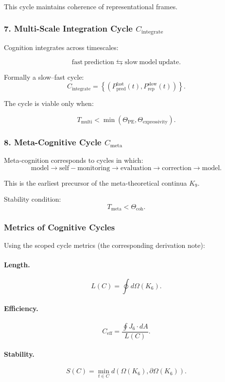 This cycle maintains coherence of representational frames.

\subsubsection{7. Multi-Scale Integration Cycle $C_{\mathrm{integrate}}$}

Cognition integrates across timescales:

\[
 \mathrm{fast\ prediction}
 \leftrightarrows
 \mathrm{slow\ model\ update}.
\]

Formally a slow–fast cycle:
\[
 C_{\mathrm{integrate}} =
 \left\{
   (P_{\mathrm{pred}}^{\mathrm{fast}}(t),
    P_{\mathrm{rep}}^{\mathrm{slow}}(t))
 \right\}.
\]

The cycle is viable only when:

\[
 T_{\mathrm{multi}} < \min(\Theta_{\mathrm{PE}},\Theta_{\mathrm{expressivity}}).
\]

\subsubsection{8. Meta-Cognitive Cycle $C_{\mathrm{meta}}$}

Meta-cognition corresponds to cycles in which:
\[
 \mathrm{model}
 \to 
 \mathrm{self-monitoring}
 \to
 \mathrm{evaluation}
 \to
 \mathrm{correction}
 \to
 \mathrm{model}.
\]

This is the earliest precursor of the meta-theoretical continua $K_9$.

Stability condition:
\[
 T_{\mathrm{meta}} < \Theta_{\mathrm{coh}}.
\]

\subsubsection{Metrics of Cognitive Cycles}

Using the scoped cycle metrics (the corresponding derivation note):

\paragraph{Length.}
\[
  L(C)=\oint d\Omega(K_6).
\]

\paragraph{Efficiency.}
\[
  C_{\mathrm{eff}}
    = \frac{\oint J_6\cdot dA}{L(C)}.
\]

\paragraph{Stability.}
\[
  S(C)
  = \min_{t\in C}
    d(\Omega(K_6),\partial\Omega(K_6)).
\]

